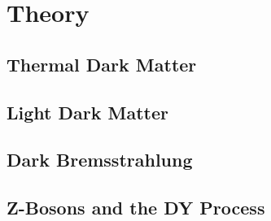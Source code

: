 \chapter{Theory}
\label{theory}
\section{Thermal Dark Matter}

\section{Light Dark Matter}

\section{Dark Bremsstrahlung}

\section{Z-Bosons and the DY Process}
